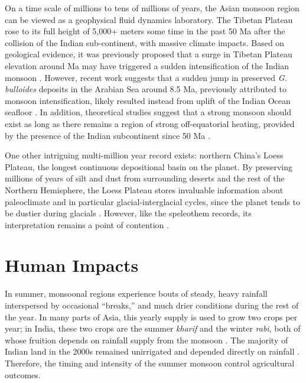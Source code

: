 	On a time scale of millions to tens of millions of years, the Asian monsoon region can be viewed as a geophysical fluid dynamics laboratory. The Tibetan Plateau rose to its full height of 5,000+ meters some time in the past 50 Ma after the collision of the Indian sub-continent, with massive climate impacts. Based on geological evidence, it was previously proposed that a surge in Tibetan Plateau elevation around  Ma may have triggered a sudden intensification of the Indian monsoon \citep{Harrison1992,Molnar1993}. However, recent work suggests that a sudden jump in preserved \textit{G. bulloides} deposits in the Arabian Sea around 8.5 Ma, previously attributed to monsoon intensification, likely resulted instead from uplift of the Indian Ocean seafloor \citep{Rodriguez2014}. In addition, theoretical studies suggest that a strong monsoon should exist as long as there remains a region of strong off-equatorial heating, provided by the presence of the Indian subcontinent since 50 Ma \citep{Prive2007a,Bordoni2008,Molnar2010}. 
	
	One other intriguing multi-million year record exists: northern China's Loess Plateau, the longest continuous depositional basin on the planet. By preserving millions of years of silt and dust from surrounding deserts and the rest of the Northern Hemisphere, the Loess Plateau stores invaluable information about paleoclimate and in particular glacial-interglacial cycles, since the planet tends to be dustier during glacials \citep{Sun2006}. However, like the speleothem records, its interpretation remains a point of contention \citep{Roe2009}.

\section{Human Impacts}

	In summer, monsoonal regions experience bouts of steady, heavy rainfall interspersed by occasional ``breaks,'' and much drier conditions during the rest of the year. In many parts of Asia, this yearly supply is used to grow two crops per year; in India, these two crops are the summer \textit{kharif} and the winter \textit{rabi}, both of whose fruition depends on rainfall supply from the monsoon \citep{Gadgil2006a}. The majority of Indian land in the 2000s remained unirrigated and depended directly on rainfall \citep{KrishnaKumar2004}. Therefore, the timing and intensity of the summer monsoon control agricultural outcomes.
	
